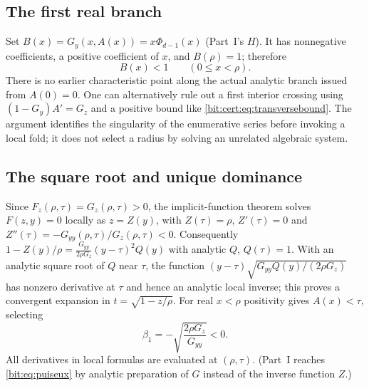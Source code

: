\documentclass[11pt]{article}
\theoremstyle{definition}\newtheorem{definition}[theorem]{Definition}
\theoremstyle{remark}\newtheorem{remark}[theorem]{Remark}
\begin{document}
\subsection{The first real branch}
Set $B(x)=G_y(x,A(x))=x\Phi_{d-1}(x)$ (Part~I's $H$). It has nonnegative
coefficients, a positive coefficient of $x$, and $B(\rho)=1$; therefore
\begin{equation}\label{bit:cert:eq:subcritical}
 B(x)<1\qquad(0\le x<\rho).
\end{equation}
There is no earlier characteristic point along the actual analytic branch
issued from $A(0)=0$. One can alternatively rule out a first interior crossing
using $(1-G_y)A'=G_z$ and a positive bound like
\eqref{bit:cert:eq:transversebound}. The argument identifies the singularity
of the enumerative series before invoking a local fold; it does not select a
radius by solving an unrelated algebraic system.

\subsection{The square root and unique dominance}\label{bit:cert:sec:local}
Since $F_z(\rho,\tau)=G_z(\rho,\tau)>0$, the implicit-function theorem solves
$F(z,y)=0$ locally as $z=Z(y)$, with $Z(\tau)=\rho$, $Z'(\tau)=0$ and
$Z''(\tau)=-G_{yy}(\rho,\tau)/G_z(\rho,\tau)<0$. Consequently
$1-Z(y)/\rho=\frac{G_{yy}}{2\rho G_z}(y-\tau)^2Q(y)$ with analytic $Q$,
$Q(\tau)=1$. With an analytic square root of $Q$ near $\tau$, the function
$(y-\tau)\sqrt{G_{yy}Q(y)/(2\rho G_z)}$ has nonzero derivative at $\tau$ and
hence an analytic local inverse; this proves a convergent expansion in
$t=\sqrt{1-z/\rho}$. For real $x<\rho$ positivity gives $A(x)<\tau$, selecting
\begin{equation}\label{bit:cert:eq:beta1}
 \beta_1=-\sqrt{\frac{2\rho G_z}{G_{yy}}}<0.
\end{equation}
All derivatives in local formulas are evaluated at $(\rho,\tau)$. (Part~I
reaches \eqref{bit:eq:puiseux} by analytic preparation of $G$ instead of the
inverse function $Z$.)
\end{document}
